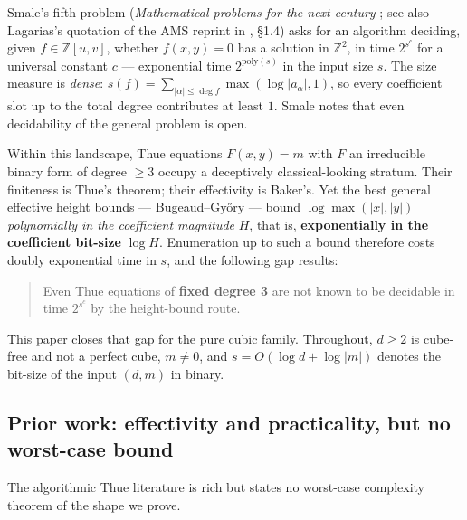 \documentclass[11pt]{amsart}
\theoremstyle{plain}
\theoremstyle{remark}
\begin{document}
Smale's fifth problem (\emph{Mathematical problems for the next
century} \cite{Sma98}; see also Lagarias's quotation of the AMS reprint
in \cite{Lag79}, \S 1.4) asks for an algorithm deciding, given
$f \in \mathbb{Z}[u,v]$, whether $f(x,y) = 0$ has a solution in
$\mathbb{Z}^2$, in time $2^{s^c}$ for a universal constant $c$ ---
exponential time $2^{\mathrm{poly}(s)}$ in the input size $s$. The size
measure is \emph{dense}:
$s(f) = \sum_{|\alpha| \le \deg f} \max(\log|a_\alpha|, 1)$, so every
coefficient slot up to the total degree contributes at least $1$. Smale
notes that even decidability of the general problem is open.

Within this landscape, Thue equations $F(x,y) = m$ with $F$ an
irreducible binary form of degree $\ge 3$ occupy a deceptively
classical-looking stratum. Their finiteness is Thue's theorem; their
effectivity is Baker's. Yet the best general effective height bounds
--- Bugeaud--Gy\H{o}ry \cite{BG96} --- bound $\log\max(|x|,|y|)$
\emph{polynomially in the coefficient magnitude} $H$, that is,
\textbf{exponentially in the coefficient bit-size} $\log H$.
Enumeration up to such a bound therefore costs doubly exponential time
in $s$, and the following gap results:

\begin{quote}
Even Thue equations of \textbf{fixed degree 3} are not known to be
decidable in time $2^{s^c}$ by the height-bound route.
\end{quote}

This paper closes that gap for the pure cubic family. Throughout,
$d \ge 2$ is cube-free and not a perfect cube, $m \ne 0$, and
$s = O(\log d + \log |m|)$ denotes the bit-size of the input $(d, m)$
in binary.

\subsection{Prior work: effectivity and practicality, but no worst-case
  bound}\label{sec:prior}

The algorithmic Thue literature is rich but states no worst-case
complexity theorem of the shape we prove.
\end{document}
